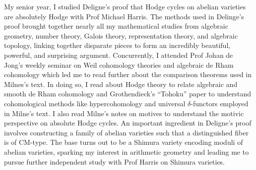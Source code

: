 \documentclass[11pt]{article}
\begin{document}
My senior year, I studied Deligne's proof that Hodge cycles on abelian varieties are absolutely Hodge with Prof Michael Harris. The methods used in Delinge's proof brought together nearly all my mathematical studies from algebraic geometry, number theory, Galois theory, representation theory, and algebraic topology, linking together disparate pieces to form an incredibly beautiful, powerful, and surprising argument. 
Concurrently, I attended Prof Johan de Jong's weekly seminar on Weil cohomology theories and algebraic de Rham cohomology which led me to read further about the comparison theorems used in Milnes's text. In doing so, I read about Hodge theory to relate algebraic and smooth de Rham cohomology and Grothendieck's ``Tohoku'' paper to understand cohomological methods like hypercohomology and universal $\delta$-functors employed in Milne's text. I also read Milne's notes on motives to understand the motivic perspective on absolute Hodge cycles. An important ingredient in Deligne's proof involves constructing a family of abelian varieties such that a distinguished fiber is of CM-type. The base turns out to be a Shimura variety encoding moduli of abelian varieties, sparking my interest in arithmetic geometry and leading me to pursue further independent study with Prof Harris on Shimura varieties.
\par
\end{document}
